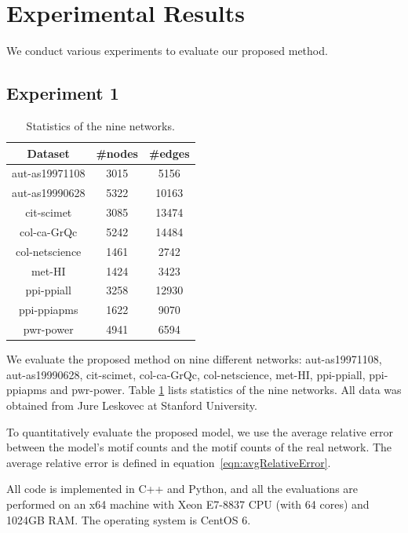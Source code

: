 \section{Experimental Results}
\label{sec:results-hillclimbing}

We conduct various experiments to evaluate our proposed method.

\subsection{Experiment 1}

\begin{table}[t]
\centering
\begin{tabular}{|c|c@{ }|c@{ }|}
\hline
Dataset             &   \#nodes       &   \#edges \\ \hline
aut-as19971108 & 3015 & 5156 \\\hline
aut-as19990628 & 5322 & 10163 \\\hline
cit-scimet & 3085 & 13474 \\\hline
col-ca-GrQc & 5242 & 14484 \\\hline
col-netscience & 1461 & 2742 \\\hline
met-HI & 1424 & 3423 \\\hline
ppi-ppiall & 3258 & 12930 \\\hline
ppi-ppiapms & 1622 & 9070 \\\hline
pwr-power & 4941 & 6594 \\\hline
\end{tabular}
\caption{Statistics of the nine networks.}
\label{tb:statistics}
\end{table}


 We evaluate the proposed method on nine different networks: aut-as19971108, aut-as19990628, cit-scimet, col-ca-GrQc, col-netscience, met-HI, ppi-ppiall, ppi-ppiapms and pwr-power.
Table \ref{tb:statistics} lists statistics of the nine networks.  All data was obtained from Jure Leskovec at Stanford University.

 To quantitatively evaluate the proposed model, we use the average relative error between the model's motif counts and the motif counts of the real network.  The average relative error is defined in equation~\ref{eqn:avgRelativeError}.

All code is implemented in C++ and Python, and all the evaluations are performed on an x64 machine with Xeon E7-8837 CPU (with 64 cores) and 1024GB RAM. The operating system is CentOS 6. 

